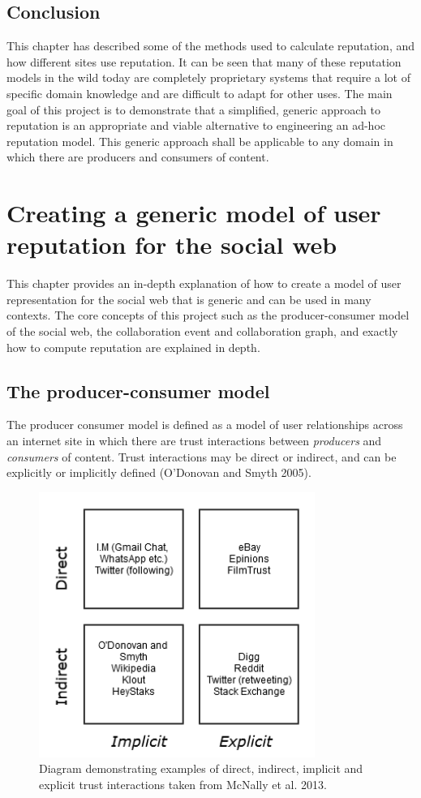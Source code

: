\documentclass[]{final_report}
\begin{document}
\section{Conclusion}

This chapter has described some of the methods used to calculate reputation, and how different sites use reputation. It can be seen that many of these reputation models in the wild today are completely proprietary systems that require a lot of specific domain knowledge and are difficult to adapt for other uses. The main goal of this project is to demonstrate that a simplified, generic approach to reputation is an appropriate and viable alternative to engineering an ad-hoc reputation model. This generic approach shall be applicable to any domain in which there are producers and consumers of content.

\chapter{Creating a generic model of user reputation for the social web}
This chapter provides an in-depth explanation of how to create a model of user representation for the social web that is generic and can be used in many contexts. The core concepts of this project such as the producer-consumer model of the social web, the collaboration event and collaboration graph, and exactly how to compute reputation are explained in depth.

\section{The producer-consumer model}

The producer consumer model is defined as a model of user relationships across an internet site in which there are trust interactions between \textsl{producers} and \textsl{consumers} of content. Trust interactions may be direct or indirect, and can be explicitly or implicitly defined (O'Donovan and Smyth 2005).

\begin{figure}[ht!]
\centering
\includegraphics[width=90mm]{chap3/trusttypes.png}
\caption{Diagram demonstrating examples of direct, indirect, implicit and explicit trust interactions taken from McNally et al. 2013.}
\end{figure}\label{gra:trusttypes}
\end{document}
